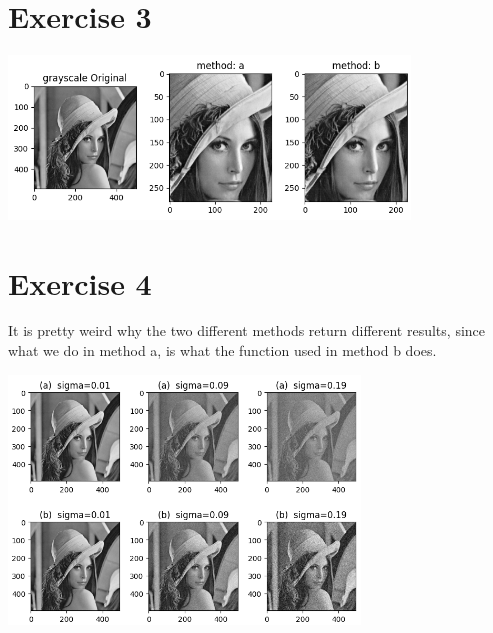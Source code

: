 \documentclass[a4paper]{article}
\begin{document}
\section*{Exercise 3}
\begin{center}
\includegraphics[width=0.8\textwidth]{images/exercice_3.PNG}\\[1cm] 
\end{center}

\section*{Exercise 4}
It is pretty weird why the two different methods return different results, since what we do in method a, is what the function used in method b does.\\
\begin{center}
\includegraphics[width=0.7\textwidth]{images/exercice_4.PNG}\\[1cm] 
\end{center}


\end{document}
